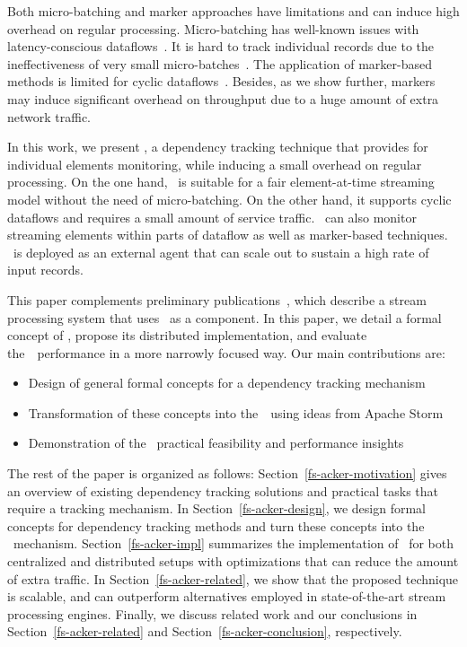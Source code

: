 Both micro-batching and marker approaches have limitations and can induce high overhead on regular processing. Micro-batching has well-known issues with latency-conscious dataflows~\cite{S7530084}. It is hard to track individual records due to the ineffectiveness of very small micro-batches~\cite{Zaharia:2012:DSE:2342763.2342773}. The application of marker-based methods is limited for cyclic dataflows~\cite{Carbone:2017:SMA:3137765.3137777}. Besides, as we show further, markers may induce significant overhead on throughput due to a huge amount of extra network traffic.

In this work, we present \tracker , a dependency tracking technique that provides for individual elements monitoring, while inducing a small overhead on regular processing. On the one hand, \tracker\ is suitable for a fair element-at-time streaming model without the need of micro-batching. On the other hand, it supports cyclic dataflows and requires a small amount of service traffic. \tracker\ can also monitor streaming elements within parts of dataflow as well as marker-based techniques. \tracker\ is deployed as an external agent that can scale out to sustain a high rate of input records. 

This paper complements preliminary publications~\cite{we2018beyondmr, we2018adbis, thepaper}, which describe a stream processing system that uses \tracker\ as a component. In this paper, we detail a formal concept of \tracker , propose its distributed implementation, and evaluate the~\tracker\ performance in a more narrowly focused way. Our main contributions are:
\begin{itemize}
    \item Design of general formal concepts for a dependency tracking mechanism
    \item Transformation of these concepts into the~\tracker\ using ideas from Apache Storm {\em \acker}~\cite{Toshniwal:2014:STO:2588555.2595641}
    \item Demonstration of the \tracker\ practical feasibility and performance insights
\end{itemize}

The rest of the paper is organized as follows: Section~\ref{fs-acker-motivation} gives an overview of existing dependency tracking solutions and practical tasks that require a tracking mechanism. In Section~\ref{fs-acker-design}, we design formal concepts for dependency tracking methods and turn these concepts into the \tracker\ mechanism. Section~\ref{fs-acker-impl} summarizes the implementation of \tracker\ for both centralized and distributed setups with optimizations that can reduce the amount of extra traffic. In Section~\ref{fs-acker-related}, we show that the proposed technique is scalable, and can outperform alternatives employed in state-of-the-art stream processing engines. Finally, we discuss related work and our conclusions in Section~\ref{fs-acker-related} and Section~\ref{fs-acker-conclusion}, respectively.